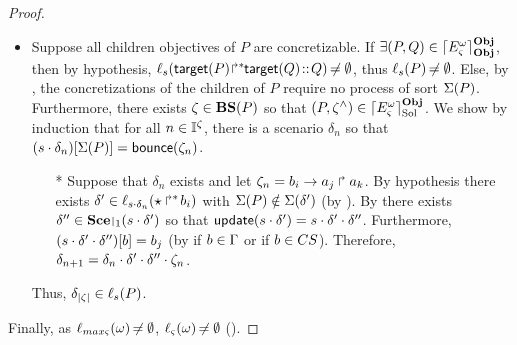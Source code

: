 \begin{proof}
\begin{itemize}
  \item Suppose all children objectives of $P$ are concretizable.
    If $\exists (P, Q) \in \lceil E_\varsigma^\omega\rceil^{\mathbf{Obj}}_{\mathbf{Obj}}$, then by hypothesis,
      $\ell_{s}({\mathsf{target}(P)\!\Rsh^*\!\!\mathsf{target}(Q)} \!::\! Q) \not\nobreak\mkern -2mu = \emptyset$, thus
      $\ell_{s}(P) \not\nobreak\mkern -2mu = \emptyset$.
    Else, by , the concretizations of the children of $P$ require no process of sort $\Sigma(P)$.
      Furthermore, there exists $\zeta \in \mathbf{BS}(P)$ so that $(P, \zeta^\wedge) \in \lceil E_\varsigma^\omega\rceil^{\mathbf{Obj}}_{\mathrm{Sol}}$.
      We show by induction that for all $n \in \mathbb{I}^{\zeta}$, there is a scenario $\delta_n$ so that ${(s \cdot \delta_n)[\Sigma(P)]} = \mathsf{bounce}(\zeta_n)$.
      \begin{itemize}
        \item[*] Suppose that $\delta_n$ exists and let $\zeta_n = b_i\rightarrow a_j\Rsh a_k$.
        By hypothesis there exists $\delta' \in \ell_{s \cdot \delta_n}(\mbox{$\star\Rsh^*\!b_i$})$ with $\Sigma(P) \notin \Sigma(\delta')$ (by ).
        By  there exists $\delta'' \in \restriction{\Sce}{1}(s \PHplay \delta')$ so that $\mathsf{update}(s \cdot \delta') = s \cdot \delta' \cdot \delta''$.
        Furthermore, ${(s \cdot \delta' \cdot \delta'')[b]} = b_j$ (by  if $b \in \Gamma$ or  if $b \in CS$).
        Therefore, $\delta_{n+1} = \delta_n \cdot \delta' \cdot \delta'' \cdot \zeta_n$.
      \end{itemize}
      Thus, $\delta_{|\zeta|} \in \ell_s(P)$. %
\end{itemize}
Finally, as $\ell_{max\varsigma}(\omega) \not\nobreak\mkern -2mu = \emptyset$, $\ell_\varsigma(\omega) \not\nobreak\mkern -2mu = \emptyset$ ().
\end{proof}





